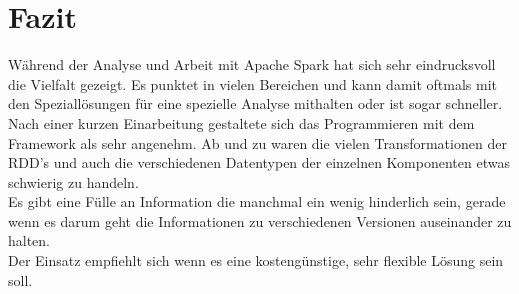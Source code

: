 \newpage
\chapter{Fazit} 

Während der Analyse und Arbeit mit Apache Spark hat sich sehr eindrucksvoll die Vielfalt gezeigt. Es punktet in vielen Bereichen und kann damit oftmals mit den Speziallösungen für eine spezielle Analyse mithalten oder ist sogar schneller.\\

\noindent
Nach einer kurzen Einarbeitung gestaltete sich das Programmieren mit dem Framework als sehr angenehm. Ab und zu waren die vielen Transformationen der RDD's und auch die verschiedenen Datentypen der einzelnen Komponenten etwas schwierig zu handeln. \\

\noindent
Es gibt eine Fülle an Information die manchmal ein wenig hinderlich sein, gerade wenn es darum geht die Informationen zu verschiedenen Versionen auseinander zu halten.\\

\noindent
Der Einsatz empfiehlt sich wenn es eine kostengünstige, sehr flexible Lösung sein soll.